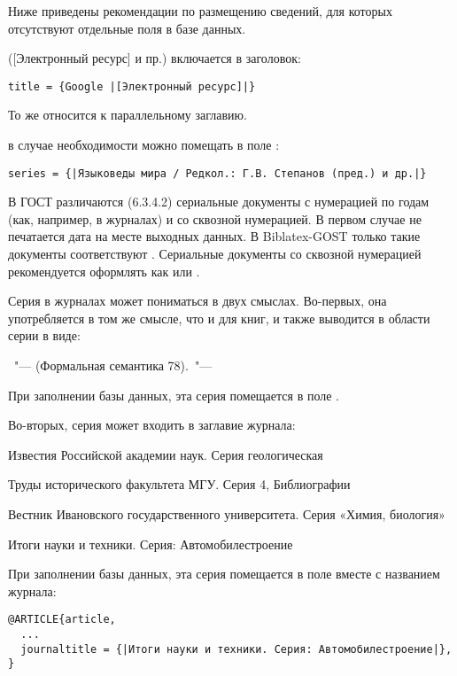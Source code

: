 \documentclass[11pt,a4paper,headings=small,numbers=enddot]{ltxdockit}[2011/03/25]
\newcommand*{\biblatexgost}{Biblatex-GOST\xspace}
\newenvironment{bibexample}{\begin{list}{}{}}{\end{list}}
\begin{document}
Ниже приведены рекомендации по размещению сведений, для которых отсутствуют
отдельные поля в базе данных.

\begin{description}
\item[Общее обозначение материала] ([Электронный ресурс] и пр.) включается в заголовок:

\begin{lstlisting}[style=bibtex,escapechar=|]
title = {Google |[Электронный ресурс]|}
\end{lstlisting}

То же относится к {параллельному заглавию}.

\item[Cведения об ответственности серии] в случае необходимости можно помещать 
в поле :  
\begin{lstlisting}[style=bibtex,escapechar=|]
series = {|Языковеды мира / Редкол.: Г.В. Степанов (пред.) и др.|}
\end{lstlisting}

\item[Серия.] В ГОСТ различаются (6.3.4.2) сериальные документы с нумерацией по годам (как, например, в журналах) и со сквозной нумерацией. В первом случае не печатается дата на месте выходных данных. В \biblatexgost только такие документы соответствуют .  Сериальные документы со сквозной нумерацией рекомендуется оформлять как  или . 

Серия в журналах может пониматься в двух смыслах. Во-первых, она употребляется в
том же смысле, что и для книг, и также выводится в области серии в виде:

\begin{bibexample}
\item \textellipsis~"--- (Формальная семантика 78).~"--- \textellipsis
\end{bibexample}

При заполнении базы данных, эта серия помещается в поле .

Во-вторых, серия может входить в заглавие журнала: 

\begin{bibexample}
\item Известия Российской академии наук. Серия геологическая
\item Труды исторического факультета МГУ. Серия 4, Библиографии
\item Вестник Ивановского государственного университета. Серия «Химия, биология»
\item Итоги науки и техники. Серия: Автомобилестроение
\end{bibexample}

При заполнении базы данных, эта серия помещается в поле 
вместе с названием журнала:

\begin{lstlisting}[style=bibtex,escapechar=|]
@ARTICLE{article,
  ...
  journaltitle = {|Итоги науки и техники. Серия: Автомобилестроение|},
}
\end{lstlisting}

\end{description}
\end{document}

